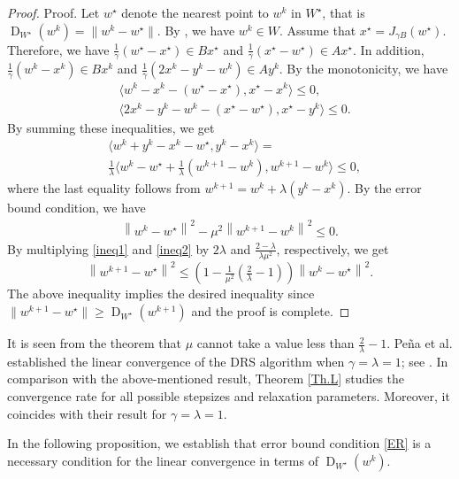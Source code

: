 \documentclass[ijoc,sglanonrev]{informs4}
\DeclareMathOperator{\dist}{D}
\begin{document}
\begin{proof}{Proof.}
 Let $w^\star$ denote the nearest point to $w^k$ in $W^\star$, that is $\dist_{W^\star}(w^k)=\|w^k-w^\star\|$. By \cite[Theorem 1]{pena2021linear}, we have $w^k\in W$. Assume that $x^\star=J_{\gamma B}(w^\star)$. Therefore, we have $\tfrac{1}{\gamma}(w^\star-x^\star)\in Bx^\star$ and $\tfrac{1}{\gamma}(x^\star-w^\star)\in Ax^\star$. In addition,   
 $\tfrac{1}{\gamma}(w^k-x^k)\in Bx^k$ and $\tfrac{1}{\gamma}(2x^k-y^k-w^k)\in Ay^k$. By the monotonicity,  we have 
 \begin{align*}
&  \langle w^k-x^k - (w^\star-x^\star),  x^\star-x^k\rangle \leq 0,\\
&  \langle 2x^k-y^k-w^k - (x^\star-w^\star),  x^\star-y^k\rangle \leq 0.
 \end{align*}
By summing these inequalities, we get 
\begin{align}\label{ineq1}
\nonumber &\langle  w^k+y^k-x^k -w^\star, y^k-x^k\rangle=
\\
 & \tfrac{1}{\lambda}\langle  w^k-w^\star+\tfrac{1}{\lambda}(w^{k+1}-w^k), w^{k+1}-w^k\rangle\leq 0,
 \end{align}
where the last equality follows from $w^{k+1}=w^k+\lambda(y^k-x^k)$. By the error bound condition, we have 
\begin{align}\label{ineq2}
\left\|  w^k-w^\star \right\|^2 -\mu^2 \left\|  w^{k+1}-w^k \right\|^2 \leq 0.
\end{align}
By multiplying \eqref{ineq1} and \eqref{ineq2} by $2\lambda$ and $\tfrac{2-\lambda}{\lambda \mu^2}$, respectively,  we get
$$
\left\|  w^{k+1}-w^\star \right\|^2
\leq 
\left( 1-\tfrac{1}{\mu^2}(\tfrac{2}{\lambda}-1) \right) \left\|  w^k-w^\star \right\|^2.
$$
The above inequality implies the desired inequality since 
$ \|w^{k+1}-w^\star \|\geq \dist_{W^\star}(w^{k+1})$
and the proof is complete. 
\Halmos
\end{proof}

It is seen from the theorem that $\mu$ cannot take a value less than $\tfrac{2}{\lambda}-1$. Pe{\~n}a et al. established the linear convergence of the DRS algorithm when $\gamma=\lambda=1$; see \cite[Theorem 1]{pena2021linear}. In comparison with the above-mentioned result, Theorem \ref{Th.L} studies the convergence rate for all possible stepsizes and relaxation parameters. Moreover, it coincides  with their result for  $\gamma=\lambda=1$. 

In the following proposition, we establish that error bound condition \eqref{ER} is a necessary condition for the linear convergence in terms of $\dist_{W^\star}(w^k)$.  
\end{document}
